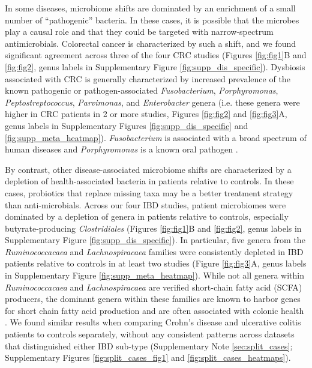 \documentclass{article}
\begin{document}
In some diseases, microbiome shifts are dominated by an enrichment of a small number of ``pathogenic'' bacteria.
In these cases, it is possible that the microbes play a causal role and that they could be targeted with narrow-spectrum antimicrobials.
Colorectal cancer is characterized by such a shift, and we found significant agreement across three of the four CRC studies \cite{crc-zhao,crc-baxter,crc-zeller,crc-xiang} (Figures \ref{fig:fig1}B and \ref{fig:fig2}, genus labels in Supplementary Figure \ref{fig:supp_dis_specific}).
Dysbiosis associated with CRC is generally characterized by increased prevalence of the known pathogenic or pathogen-associated \textit{Fusobacterium}, \textit{Porphyromonas}, \textit{Peptostreptococcus}, \textit{Parvimonas}, and \textit{Enterobacter} genera (i.e. these genera were higher in CRC patients in 2 or more studies, Figures \ref{fig:fig2} and \ref{fig:fig3}A, genus labels in Supplementary Figures \ref{fig:supp_dis_specific} and \ref{fig:supp_meta_heatmap}). 
\textit{Fusobacterium} is associated with a broad spectrum of human diseases and \textit{Porphyromonas} is a known oral pathogen \cite{Han2015fusopatho, Flynn2016oral}.

By contrast, other disease-associated microbiome shifts are characterized by a depletion of health-associated bacteria in patients relative to controls.
In these cases, probiotics that replace missing taxa may be a better treatment strategy than anti-microbials.
Across our four IBD studies, patient microbiomes were dominated by a depletion of genera in patients relative to controls, especially butyrate-producing \textit{Clostridiales} \cite{ibd-papa,ibd-gevers,ibd-hut,ibd-engstrand} (Figures \ref{fig:fig1}B and \ref{fig:fig2}, genus labels in Supplementary Figure \ref{fig:supp_dis_specific}). 
In particular, five genera from the \textit{Ruminococcacaea} and \textit{Lachnospiracaea} families were consistently depleted in IBD patients relative to controls in at least two studies (Figure \ref{fig:fig3}A, genus labels in Supplementary Figure \ref{fig:supp_meta_heatmap}).
While not all genera within \textit{Ruminococcacaea} and \textit{Lachnospiracaea} are verified short-chain fatty acid (SCFA) producers, the dominant genera within these families are known to harbor genes for short chain fatty acid production \cite{louis2010diversity} and are often associated with colonic health \cite{flint2012role,miquel2013faecalibacterium,reeves2012suppression}. 
We found similar results when comparing Crohn's disease and ulcerative colitis patients to controls separately, without any consistent patterns across datasets that distinguished either IBD sub-type (Supplementary Note \ref{sec:split_cases}; Supplementary Figures \ref{fig:split_cases_fig1} and \ref{fig:split_cases_heatmaps}).
\end{document}
